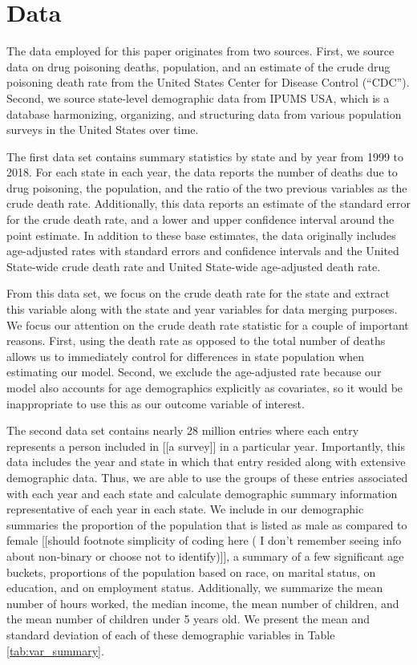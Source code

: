 \documentclass{article}
\begin{document}
\section{Data}

The data employed for this paper originates from two sources. First, we source data on drug poisoning deaths, population, and an estimate of the crude drug poisoning death rate from the United States Center for Disease Control (``CDC''). Second, we source state-level demographic data from IPUMS USA, which is a database harmonizing, organizing, and structuring data from various population surveys in the United States over time.

The first data set contains summary statistics by state and by year from 1999 to 2018. For each state in each year, the data reports the number of deaths due to drug poisoning, the population, and the ratio of the two previous variables as the crude death rate. Additionally, this data reports an estimate of the standard error for the crude death rate, and a lower and upper confidence interval around the point estimate. In addition to these base estimates, the data originally includes age-adjusted rates with standard errors and confidence intervals and the United State-wide crude death rate and United State-wide age-adjusted death rate. 

From this data set, we focus on the crude death rate for the state and extract this variable along with the state and year variables for data merging purposes. We focus our attention on the crude death rate statistic for a couple of important reasons. First, using the death rate as opposed to the total number of deaths allows us to immediately control for differences in state population when estimating our model. Second, we exclude the age-adjusted rate because our model also accounts for age demographics explicitly as covariates, so it would be inappropriate to use this as our outcome variable of interest.

The second data set contains nearly 28 million entries where each entry represents a person included in [[a survey]] in a particular year.  Importantly, this data includes the year and state in which that entry resided along with extensive demographic data. Thus, we are able to use the groups of these entries associated with each year and each state and calculate demographic summary information representative of each year in each state. We include in our demographic summaries the proportion of the population that is listed as male as compared to female [[should footnote simplicity of coding here ( I don't remember seeing info about non-binary or choose not to identify)]], a summary of a few significant age buckets, proportions of the population based on race, on marital status, on education, and on employment status. Additionally, we summarize the mean number of hours worked, the median income, the mean number of children, and the mean number of children under 5 years old. We present the mean and standard deviation of each of these demographic variables in Table \ref{tab:var_summary}.
\end{document}
